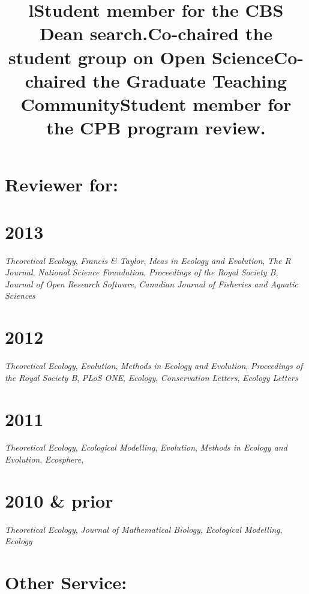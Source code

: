 \documentclass[margin]{res}
\begin{document}
\begin{resume}
\section{Reviewer for:}
\section{\textnormal{2013}}
\emph{Theoretical Ecology}, \emph{Francis \& Taylor}, \emph{Ideas in Ecology and Evolution}, \emph{The R Journal}, \emph{National Science Foundation}, \emph{Proceedings of the Royal Society B}, \emph{Journal of Open Research Software}, \emph{Canadian Journal of Fisheries and Aquatic Sciences} 

\section{\textnormal{2012}}
\emph{Theoretical Ecology}, \emph{Evolution}, \emph{Methods in Ecology and Evolution}, \emph{Proceedings of the Royal Society B}, \emph{PLoS ONE}, \emph{Ecology}, \emph{Conservation Letters}, \emph{Ecology Letters} 

\section{\textnormal{2011}}
\emph{Theoretical Ecology}, \emph{Ecological Modelling}, \emph{Evolution}, \emph{Methods in Ecology and Evolution}, \emph{Ecosphere}, 

\section{\textnormal{2010 \& prior}}
\emph{Theoretical Ecology}, \emph{Journal of Mathematical Biology}, \emph{Ecological Modelling}, \emph{Ecology}

\section{Other Service:} 
\begin{format}
\title{l}\\
\body 
\end{format}

\title{Student  member for the CBS Dean search.}
\begin{position} \vspace{-.8cm} \end{position}
\title{Co-chaired the student group on Open Science}
\begin{position} \vspace{-.8cm} \end{position}
\title{Co-chaired the Graduate Teaching Community}
\begin{position} \vspace{-.8cm} \end{position}
\title{Student member for the CPB program review.}
\begin{position} \vspace{0cm} \end{position}



\end{resume}
\end{document}
